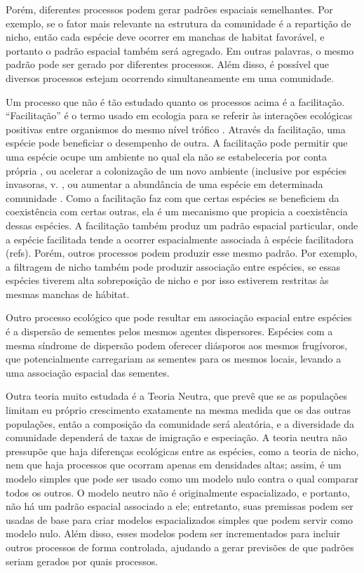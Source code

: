 \documentclass[twoside,12pt,a4paper]{report}
\begin{document}
Porém, diferentes processos podem gerar padrões espaciais semelhantes. Por exemplo, se o
fator mais relevante na estrutura da comunidade é a repartição de nicho, então cada espécie
deve ocorrer em manchas de habitat favorável, e portanto o padrão espacial também será
agregado. Em outras palavras, o mesmo padrão pode ser gerado por diferentes processos. Além
disso, é possível que diversos processos estejam ocorrendo simultaneamente em uma comunidade.

Um processo que não é tão estudado quanto os processos acima é a facilitação.
“Facilitação” é o termo usado em ecologia para se referir às interações ecológicas positivas entre
organismos do mesmo nível trófico \citep{Pakeman2009}. 
Através da facilitação, uma espécie pode beneficiar o desempenho de outra. 
A facilitação pode permitir que uma
espécie ocupe um ambiente no qual ela não se estabeleceria por conta própria \citep{Lortie2004},
ou acelerar a colonização de um novo ambiente (inclusive por espécies invasoras, v.
\citep{Wundrow2012}, ou aumentar a abundância de uma espécie em determinada comunidade \citep{Alados2006; CallawayBook}.
Como a facilitação faz com que certas espécies se beneficiem da coexistência com certas
outras, ela é um mecanismo que propicia a coexistência dessas espécies.
A facilitação também produz um padrão espacial particular, onde a espécie facilitada tende a
ocorrer espacialmente associada à espécie facilitadora (refs).
Porém, outros processos podem produzir esse mesmo padrão. Por exemplo, a filtragem de nicho
também pode produzir associação entre espécies, se essas espécies tiverem alta sobreposição
de nicho e por isso estiverem restritas às mesmas manchas de hábitat.

Outro processo ecológico que pode resultar em associação espacial entre espécies é a
dispersão de sementes pelos mesmos agentes dispersores. Espécies com a mesma síndrome de
dispersão podem oferecer diásporos aos mesmos frugívoros, que potencialmente carregariam as
sementes para os mesmos locais, levando a uma associação espacial das sementes. 

Outra teoria muito estudada é a Teoria Neutra, que prevê que se as populações limitam eu
próprio crescimento exatamente na mesma medida que os das outras populações, então a
composição da comunidade será aleatória, e a diversidade da comunidade dependerá de taxas de
imigração e especiação. A teoria neutra não pressupõe que haja diferenças ecológicas entre
as espécies, como a teoria de nicho, nem que haja processos que ocorram apenas em densidades
altas; assim, é um modelo simples que pode ser usado como um modelo nulo contra o qual comparar
todos os outros. O modelo neutro não é originalmente espacializado, e portanto, não há
um padrão espacial associado a ele; entretanto, suas premissas podem ser usadas de base para
criar modelos espacializados simples que podem servir como modelo nulo. Além disso, esses
modelos podem ser incrementados para incluir outros processos de forma controlada, ajudando a
gerar previsões de que padrões seriam gerados por quais processos.
\end{document}
